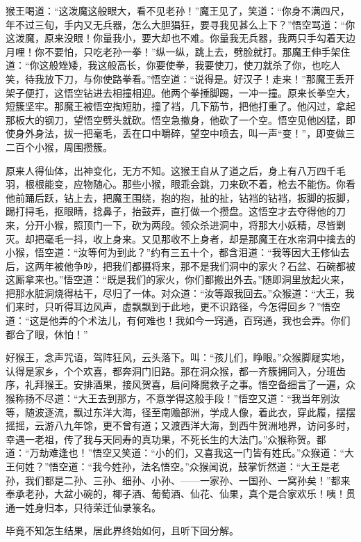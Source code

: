 \documentclass[12pt]{lsbook}
\begin{document}
猴王喝道：“这泼魔这般眼大，看不见老孙！”魔王见了，笑道：“你身不满四尺，年不过三旬，手内又无兵器，怎么大胆猖狂，要寻我见甚么上下？”悟空骂道：“你这泼魔，原来没眼！你量我小，要大却也不难。你量我无兵器，我两只手勾着天边月哩！你不要怕，只吃老孙一拳！”纵一纵，跳上去，劈脸就打。那魔王伸手架住道：“你这般矬矮，我这般高长，你要使拳，我要使刀，使刀就杀了你，也吃人笑，待我放下刀，与你使路拳看。”悟空道：“说得是。好汉子！走来！”那魔王丢开架子便打，这悟空钻进去相撞相迎。他两个拳捶脚踢，一冲一撞。原来长拳空大，短簇坚牢。那魔王被悟空掏短肋，撞了裆，几下筋节，把他打重了。他闪过，拿起那板大的钢刀，望悟空劈头就砍。悟空急撤身，他砍了一个空。悟空见他凶猛，即使身外身法，拔一把毫毛，丢在口中嚼碎，望空中喷去，叫一声“变！”，即变做三二百个小猴，周围攒簇。

原来人得仙体，出神变化，无方不知。这猴王自从了道之后，身上有八万四千毛羽，根根能变，应物随心。那些小猴，眼乖会跳，刀来砍不着，枪去不能伤。你看他前踊后跃，钻上去，把魔王围绕，抱的抱，扯的扯，钻裆的钻裆，扳脚的扳脚，踢打挦毛，抠眼睛，捻鼻子，抬鼓弄，直打做一个攒盘。这悟空才去夺得他的刀来，分开小猴，照顶门一下，砍为两段。领众杀进洞中，将那大小妖精，尽皆剿灭。却把毫毛一抖，收上身来。又见那收不上身者，却是那魔王在水帘洞中擒去的小猴，悟空道：“汝等何为到此？”约有三五十个，都含泪道：“我等因大王修仙去后，这两年被他争吵，把我们都摄将来，那不是我们洞中的家火？石盆、石碗都被这厮拿来也。”悟空道：“既是我们的家火，你们都搬出外去。”随即洞里放起火来，把那水脏洞烧得枯干，尽归了一体。对众道：“汝等跟我回去。”众猴道：“大王，我们来时，只听得耳边风声，虚飘飘到于此地，更不识路径，今怎得回乡？”悟空道：“这是他弄的个术法儿，有何难也！我如今一窍通，百窍通，我也会弄。你们都合了眼，休怕！”

好猴王，念声咒语，驾阵狂风，云头落下。叫：“孩儿们，睁眼。”众猴脚屣实地，认得是家乡，个个欢喜，都奔洞门旧路。那在洞众猴，都一齐簇拥同入，分班齿序，礼拜猴王。安排酒果，接风贺喜，启问降魔救子之事。悟空备细言了一遍，众猴称扬不尽道：“大王去到那方，不意学得这般手段！”悟空又道：“我当年别汝等，随波逐流，飘过东洋大海，径至南赡部洲，学成人像，着此衣，穿此履，摆摆摇摇，云游八九年馀，更不曾有道；又渡西洋大海，到西牛贺洲地界，访问多时，幸遇一老祖，传了我与天同寿的真功果，不死长生的大法门。”众猴称贺。都道：“万劫难逢也！”悟空又笑道：“小的们，又喜我这一门皆有姓氏。”众猴道：“大王何姓？”悟空道：“我今姓孙，法名悟空。”众猴闻说，鼓掌忻然道：“大王是老孙，我们都是二孙、三孙、细孙、小孙、——一家孙、一国孙、一窝孙矣！”都来奉承老孙，大盆小碗的，椰子酒、葡萄酒、仙花、仙果，真个是合家欢乐！咦！贯通一姓身归本，只待荣迁仙录箓名。

毕竟不知怎生结果，居此界终始如何，且听下回分解。
\end{document}
